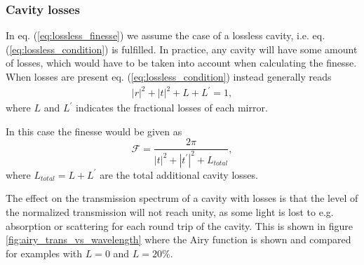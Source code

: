 \subsubsection{Cavity losses}\label{sec:cavity_losses}

In eq. (\ref{eq:lossless_finesse}) we assume the case of a lossless cavity, i.e. eq. (\ref{eq:lossless_condition}) is fulfilled. In practice, any cavity will have some amount of losses, which would have to be taken into account when calculating the finesse. When losses are present eq. (\ref{eq:lossless_condition}) instead generally reads
\begin{eqnarray}
    |r|^2 + |t|^2 + L + L^{\prime} = 1,
\end{eqnarray}
where $L$ and $L^{\prime}$ indicates the fractional losses of each mirror.

In this case the finesse would be given as 
\begin{equation}
    \mathcal{F} = \frac{2 \pi}{|t|^2 + |t^{\prime}|^2 + L_{total}},
\end{equation}
where $L_{total} = L + L^{\prime}$ are the total additional cavity losses.

The effect on the transmission spectrum of a cavity with losses is that the level of the normalized transmission will not reach unity, as some light is lost to e.g. absorption or scattering for each round trip of the cavity. This is shown in figure \ref{fig:airy_trans_vs_wavelength} where the Airy function is shown and compared for examples with $L=0$ and $L=20\%$.
